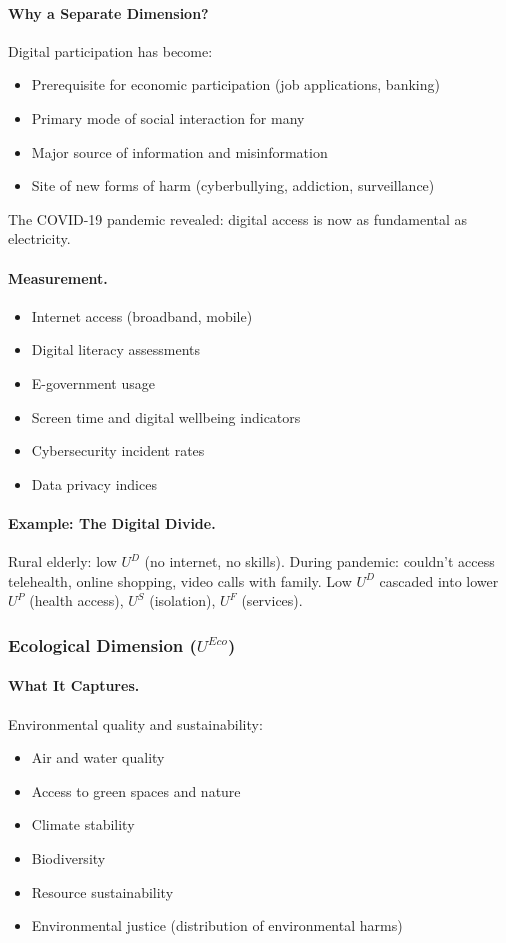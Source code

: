 \documentclass[12pt,a4paper]{article}
\begin{document}
\paragraph{Why a Separate Dimension?}
Digital participation has become:
\begin{itemize}
  \item Prerequisite for economic participation (job applications, banking)
  \item Primary mode of social interaction for many
  \item Major source of information and misinformation
  \item Site of new forms of harm (cyberbullying, addiction, surveillance)
\end{itemize}

The COVID-19 pandemic revealed: digital access is now as fundamental as electricity.

\paragraph{Measurement.}
\begin{itemize}
  \item Internet access (broadband, mobile)
  \item Digital literacy assessments
  \item E-government usage
  \item Screen time and digital wellbeing indicators
  \item Cybersecurity incident rates
  \item Data privacy indices
\end{itemize}

\paragraph{Example: The Digital Divide.}
Rural elderly: low $U^D$ (no internet, no skills).
During pandemic: couldn't access telehealth, online shopping, video calls with family.
Low $U^D$ cascaded into lower $U^P$ (health access), $U^S$ (isolation), $U^F$ (services).

\subsubsection{Ecological Dimension ($U^{Eco}$)}

\paragraph{What It Captures.}
Environmental quality and sustainability:
\begin{itemize}
  \item Air and water quality
  \item Access to green spaces and nature
  \item Climate stability
  \item Biodiversity
  \item Resource sustainability
  \item Environmental justice (distribution of environmental harms)
\end{itemize}
\end{document}
